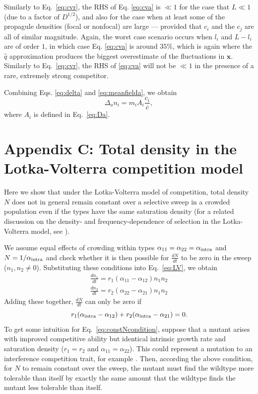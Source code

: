 \documentclass[12pt]{article}
\begin{document}
Similarly to Eq.~\eqref{eq:cvr}, the RHS of Eq. \eqref{eq:cva} is $\ll 1$ for the case that $L \ll 1$ (due to a factor of $D^{1/2}$), and also for the case when at least some of the propagule densities (focal or nonfocal) are large --- provided that $c_i$ and the $c_j$ are all of similar magnitude. Again, the worst case scenario occurs when $l_i$ and $L-l_i$ are of order $1$, in which case Eq. \eqref{eq:cva} is around $35\%$, which is again where the $\hat{q}$ approximation produces the biggest overestimate of the fluctuations in ${\mathbf x}$. Similarly to Eq.~\eqref{eq:cvr}, the RHS of \eqref{eq:cva} will not be $\ll 1$ in the presence of a rare, extremely strong competitor.  

Combining Eqs. \eqref{eq:delta} and \eqref{eq:meanfielda}, we obtain
\begin{equation}
\Delta_a n_i=m_i A_i \frac{c_i}{\overline{c}},
\end{equation}
where $A_i$ is defined in Eq.~\eqref{eq:Da}.

\section*{Appendix C: Total density in the Lotka-Volterra competition model}

Here we show that under the Lotka-Volterra model of competition, total density $N$ does not in general remain constant over a selective sweep in a crowded population even if the types have the same saturation density (for a related discussion on the density- and frequency-dependence of selection in the Lotka-Volterra model, see \citep{smouse_1976,mallet_2012}).

We assume equal effects of crowding within types $\alpha_{11}=\alpha_{22}=\alpha_{\rm intra}$ and $N=1/\alpha_{\rm intra}$ and check whether it is then possible for $\frac{dN}{dt}$ to be zero in the sweep ($n_1,n_2 \neq 0$). Substituting these conditions into Eq.~\eqref{eq:LV}, we obtain 
\begin{align}
\frac{d n_1}{dt} = r_1(\alpha_{11}-\alpha_{12})n_1n_2 \nonumber\\
\frac{d n_2}{dt} = r_2(\alpha_{22}-\alpha_{21})n_1n_2
\end{align}
Adding these together, $\frac{dN}{dt}$ can only be zero if 
\begin{equation}
r_1(\alpha_{\rm intra}-\alpha_{12})+r_2(\alpha_{\rm intra}-\alpha_{21})=0. \label{eq:constNcondition}
\end{equation}
To get some intuition for Eq.~\eqref{eq:constNcondition}, suppose that a mutant arises with improved competitive ability but identical intrinsic growth rate and saturation density ($r_1=r_2$ and $\alpha_{11}=\alpha_{22}$). This could represent a mutation to an interference competition trait, for example \citep{gill_1974}. Then, according the above condition, for $N$ to remain constant over the sweep, the mutant must find the wildtype more tolerable than itself by exactly the same amount that the wildtype finds the mutant less tolerable than itself. 
\end{document}

